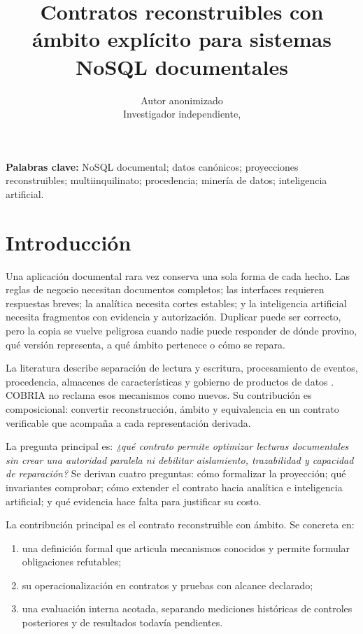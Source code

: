 \documentclass[12pt]{article}
\title{\textbf{Contratos reconstruibles con ámbito explícito para sistemas NoSQL documentales}}
\author{\ifnum\blindreview=1 Autor anonimizado\else\COBRIAAutor\\Investigador independiente, \COBRIALugar\fi}
\date{\COBRIAAnio}
\begin{document}
\maketitle

\begin{abstract}
\COBRIAResumenCientifico
\end{abstract}

\noindent\textbf{Palabras clave:} NoSQL documental; datos canónicos; proyecciones
reconstruibles; multiinquilinato; procedencia; minería de datos; inteligencia artificial.

\section{Introducción}

Una aplicación documental rara vez conserva una sola forma de cada hecho. Las reglas de
negocio necesitan documentos completos; las interfaces requieren respuestas breves;
la analítica necesita cortes estables; y la inteligencia artificial necesita fragmentos
con evidencia y autorización. Duplicar puede ser correcto, pero la copia se vuelve
peligrosa cuando nadie puede responder de dónde provino, qué versión representa, a qué
ámbito pertenece o cómo se repara.

La literatura describe separación de lectura y escritura, procesamiento de eventos,
procedencia, almacenes de características y gobierno de productos de datos
\parencite{microsoft2025cqrs,fowler2005eventsourcing,buneman2001provenance,
orr2021featurestores,li2023featurestore}. COBRIA no reclama esos mecanismos como nuevos.
Su contribución es composicional: convertir reconstrucción, ámbito y equivalencia en un
contrato verificable que acompaña a cada representación derivada.

La pregunta principal es: \emph{¿qué contrato permite optimizar lecturas documentales
sin crear una autoridad paralela ni debilitar aislamiento, trazabilidad y capacidad de
reparación?} Se derivan cuatro preguntas: cómo formalizar la proyección; qué invariantes
comprobar; cómo extender el contrato hacia analítica e inteligencia artificial; y qué
evidencia hace falta para justificar su costo.

La contribución principal es el contrato reconstruible con ámbito. Se concreta en:
\begin{enumerate}[leftmargin=*]
\item una definición formal que articula mecanismos conocidos y permite formular
obligaciones refutables;
\item su operacionalización en contratos y pruebas con alcance declarado;
\item una evaluación interna acotada, separando mediciones históricas de controles
posteriores y de resultados todavía pendientes.
\end{enumerate}
\end{document}
